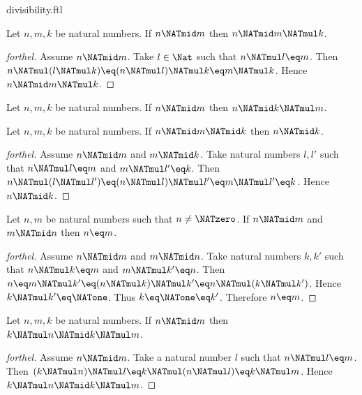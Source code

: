 \documentclass{naproche-library}
\begin{document}
\begin{smodule}[title=Divisibility]{divisibility.ftl}
\begin{proposition}[forthel,id=ARITHMETIC_07_7463519983239168]
  Let $n, m, k$ be natural numbers.
  If $n \NATmid m$ then $n \NATmid m \NATmul k$.
\end{proposition}
\begin{proof}[forthel]
  Assume $n \NATmid m$.
  Take $l \in \Nat$ such that $n \NATmul l \eq m$.
  Then $n \NATmul (l \NATmul k)
    \eq (n \NATmul l) \NATmul k
    \eq m \NATmul k$.
  Hence $n \NATmid m \NATmul k$.
\end{proof}

\begin{corollary}[forthel,id=ARITHMETIC_07_1588185794609152]
  Let $n, m, k$ be natural numbers.
  If $n \NATmid m$ then $n \NATmid k \NATmul m$.
\end{corollary}

\begin{proposition}[forthel,id=ARITHMETIC_07_7863858316181504]
  Let $n, m, k$ be natural numbers.
  If $n \NATmid m \NATmid k$ then $n \NATmid k$.
\end{proposition}
\begin{proof}[forthel]
  Assume $n \NATmid m$ and $m \NATmid k$.
  Take natural numbers $l,l'$ such that $n \NATmul l \eq m$ and $m \NATmul l' \eq k$.
  Then $n \NATmul (l \NATmul l')
    \eq (n \NATmul l) \NATmul l'
    \eq m \NATmul l'
    \eq k$.
  Hence $n \NATmid k$.
\end{proof}

\begin{proposition}[forthel,id=ARITHMETIC_07_4933275640397824]
  Let $n, m$ be natural numbers such that $n \neq \NATzero$.
  If $n \NATmid m$ and $m \NATmid n$ then $n \eq m$.
\end{proposition}
\begin{proof}[forthel]
  Assume $n \NATmid m$ and $m \NATmid n$.
  Take natural numbers $k,k'$ such that $n \NATmul k \eq m$ and $m \NATmul k' \eq n$.
  Then $n
    \eq m \NATmul k'
    \eq (n \NATmul k) \NATmul k'
    \eq n \NATmul (k \NATmul k')$.
  Hence $k \NATmul k' \eq \NATone$.
  Thus $k \eq \NATone \eq k'$.
  Therefore $n \eq m$.
\end{proof}

\begin{proposition}[forthel,id=ARITHMETIC_07_1283495225720832]
  Let $n, m, k$ be natural numbers.
  If $n \NATmid m$ then $k \NATmul n \NATmid k \NATmul m$.
\end{proposition}
\begin{proof}[forthel]
  Assume $n \NATmid m$.
  Take a natural number $l$ such that $n \NATmul l \eq m$.
  Then $(k \NATmul n) \NATmul l
    \eq k \NATmul (n \NATmul l)
    \eq k \NATmul m$.
  Hence $k \NATmul n \NATmid k \NATmul m$.
\end{proof}


\end{smodule}
\end{document}
